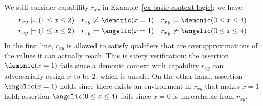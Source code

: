 \begin{example} We still consider capability $r_{xy}$ in Example~\ref{ex-basic-context-logic}; we have:
  \begin{align*}
    &r_{xy} \models (1 \leq x \leq 2)
    && r_{xy} \not\models \demonic (x = 1)
    && r_{xy} \models \demonic (0 \leq x \leq 4)
    \\&r_{xy} \models (1 \leq x \leq 2)
    && r_{xy} \models \angelic (x = 1)
    && r_{xy} \not\models \angelic (0 \leq x \leq 4)
  \end{align*}
In the first line, $r_{xy}$ is allowed to satisfy qualifiers that are overapproximations of the values it can actually reach. This is safety verification: the assertion $\demonic (x = 1)$ fails since a demonic context with capability $r_{xy}$ can adversarially assign $x$ to be $2$, which is unsafe. On the other hand, assertion $\angelic (x = 1)$ holds since there exists an environment in $r_{xy}$ that makes $x = 1$ hold; assertion $\angelic (0 \leq x \leq 4)$ fails since $x = 0$ is unreachable from $r_{xy}$.
\end{example}


